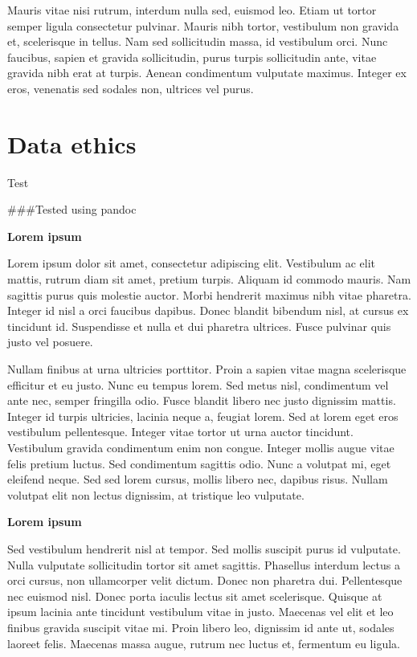 \documentclass[
]{book}
\begin{document}
Mauris vitae nisi rutrum, interdum nulla sed, euismod leo. Etiam ut tortor semper ligula consectetur pulvinar. Mauris nibh tortor, vestibulum non gravida et, scelerisque in tellus. Nam sed sollicitudin massa, id vestibulum orci. Nunc faucibus, sapien et gravida sollicitudin, purus turpis sollicitudin ante, vitae gravida nibh erat at turpis. Aenean condimentum vulputate maximus. Integer ex eros, venenatis sed sodales non, ultrices vel purus.

\hypertarget{data-ethics}{%
\chapter{Data ethics}\label{data-ethics}}

Test

\#\#\#Tested using pandoc

\textbf{Lorem ipsum}

Lorem ipsum dolor sit amet, consectetur adipiscing elit. Vestibulum ac
elit mattis, rutrum diam sit amet, pretium turpis. Aliquam id commodo
mauris. Nam sagittis purus quis molestie auctor. Morbi hendrerit maximus
nibh vitae pharetra. Integer id nisl a orci faucibus dapibus. Donec
blandit bibendum nisl, at cursus ex tincidunt id. Suspendisse et nulla
et dui pharetra ultrices. Fusce pulvinar quis justo vel posuere.

Nullam finibus at urna ultricies porttitor. Proin a sapien vitae magna
scelerisque efficitur et eu justo. Nunc eu tempus lorem. Sed metus nisl,
condimentum vel ante nec, semper fringilla odio. Fusce blandit libero
nec justo dignissim mattis. Integer id turpis ultricies, lacinia neque
a, feugiat lorem. Sed at lorem eget eros vestibulum pellentesque.
Integer vitae tortor ut urna auctor tincidunt. Vestibulum gravida
condimentum enim non congue. Integer mollis augue vitae felis pretium
luctus. Sed condimentum sagittis odio. Nunc a volutpat mi, eget eleifend
neque. Sed sed lorem cursus, mollis libero nec, dapibus risus. Nullam
volutpat elit non lectus dignissim, at tristique leo vulputate.

\textbf{Lorem ipsum}

Sed vestibulum hendrerit nisl at tempor. Sed mollis suscipit purus id
vulputate. Nulla vulputate sollicitudin tortor sit amet sagittis.
Phasellus interdum lectus a orci cursus, non ullamcorper velit dictum.
Donec non pharetra dui. Pellentesque nec euismod nisl. Donec porta
iaculis lectus sit amet scelerisque. Quisque at ipsum lacinia ante
tincidunt vestibulum vitae in justo. Maecenas vel elit et leo finibus
gravida suscipit vitae mi. Proin libero leo, dignissim id ante ut,
sodales laoreet felis. Maecenas massa augue, rutrum nec luctus et,
fermentum eu ligula.
\end{document}
